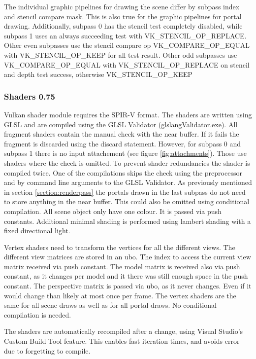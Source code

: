 The individual  graphic pipelines for drawing the scene differ by subpass index and stencil compare mask. This is also true for the graphic pipelines for portal drawing. Additionally, subpass 0 has the stencil test completely disabled, while subpass 1 uses an always succeeding test with VK\_STENCIL\_OP\_REPLACE. Other even subpasses use the stencil compare op VK\_COMPARE\_OP\_EQUAL with VK\_STENCIL\_OP\_KEEP for all test result. Other odd subpasses use VK\_COMPARE\_OP\_EQUAL with VK\_STENCIL\_OP\_REPLACE on stencil and depth test success, otherwise VK\_STENCIL\_OP\_KEEP

\subsubsection{Shaders 0.75}
Vulkan shader module requires the SPIR-V format. The shaders are written using GLSL and are compiled using the GLSL Validator (glslangValidator.exe). All fragment shaders contain the manual check with the near buffer. If it fails the fragment is discarded using the discard statement. However, for subpass 0 and subpass 1 there is no input attachement (see figure \ref{fig:attachments}). Those use shaders where the check is omitted. To prevent shader redundancies the shader is compiled twice. One of the compilations skips the check using the preprocessor and by command line arguments to the GLSL Validator. As previously mentioned in section \ref{section:renderpass} the portals drawn in the last subpass do not need to store anything in the near buffer. This could also be omitted using conditional compilation. All scene object only have one colour. It is passed via push constants. Additional minimal shading is performed using lambert shading with a fixed directional light.

Vertex shaders need to transform the vertices for all the different views. The different view matrices are stored in an \gls{ubo}. The index to access the current view matrix received via push constant. The model matrix is received also via push constant, as it changes per model and it there was still enough space in the push constant. The perspective matrix is passed via \gls{ubo}, as it never changes. Even if it would change than likely at most once per frame. The vertex shaders are the same for all scene draws as well as for all portal draws. No conditional compilation is needed.


The shaders are automatically recompiled after a change, using Visual Studio's Custom Build Tool feature. This enables fast iteration times, and avoids error due to forgetting to compile.

